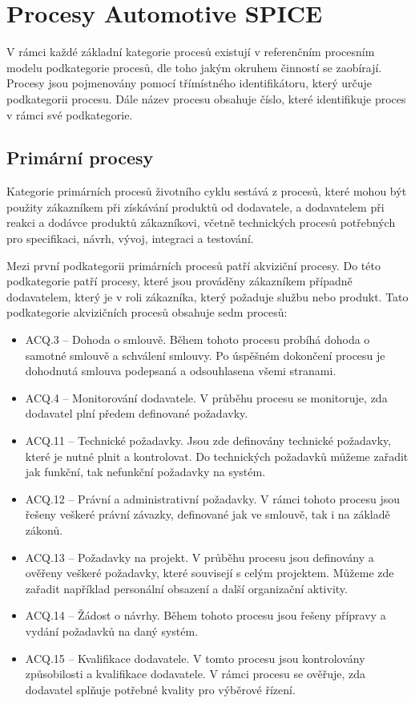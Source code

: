 \documentclass[czech,master]{diploma}
\begin{document}

\section{Procesy Automotive SPICE}
\label{sec:aspice_processes}
V rámci každé základní kategorie procesů existují v referenčním procesním modelu podkategorie procesů, dle toho jakým okruhem činností se zaobírají. Procesy jsou pojmenovány pomocí třímístného identifikátoru, který určuje podkategorii procesu. Dále název procesu obsahuje číslo, které identifikuje proces v rámci své podkategorie.

\subsection{Primární procesy}
Kategorie primárních procesů životního cyklu sestává z procesů, které mohou být použity zákazníkem při získávání produktů od dodavatele, a dodavatelem při reakci a dodávce produktů zákazníkovi, včetně technických procesů potřebných pro specifikaci, návrh, vývoj, integraci a testování.

Mezi první podkategorii primárních procesů patří akviziční procesy. Do této podkategorie patří procesy, které jsou prováděny zákazníkem případně dodavatelem, který je v roli zákazníka, který požaduje  službu nebo produkt. Tato podkategorie akvizičních procesů obsahuje sedm procesů:

\begin{itemize}
\item ACQ.3 -- Dohoda o smlouvě. Během tohoto procesu probíhá dohoda o samotné smlouvě a schválení smlouvy. Po úspěšném dokončení procesu je dohodnutá smlouva podepsaná a odsouhlasena všemi stranami.
\item ACQ.4 -- Monitorování dodavatele. V průběhu procesu se monitoruje, zda dodavatel plní předem definované požadavky.
\item ACQ.11 -- Technické požadavky. Jsou zde definovány technické požadavky, které je nutné plnit a kontrolovat. Do technických požadavků můžeme zařadit jak funkční, tak nefunkční požadavky na systém.
\item ACQ.12 -- Právní a administrativní požadavky. V rámci tohoto procesu jsou řešeny veškeré právní závazky, definované jak ve smlouvě, tak i  na základě zákonů.
\item ACQ.13 -- Požadavky na projekt. V průběhu procesu jsou definovány a ověřeny veškeré požadavky, které souvisejí s celým projektem. Můžeme zde zařadit například personální obsazení a další organizační aktivity.
\item ACQ.14 -- Žádost o návrhy.  Během tohoto procesu jsou řešeny přípravy a vydání požadavků na daný systém.
\item ACQ.15 -- Kvalifikace dodavatele. V tomto procesu jsou kontrolovány způsobilosti a kvalifikace dodavatele. V rámci procesu se ověřuje, zda dodavatel splňuje potřebné kvality pro výběrové řízení.
\end{itemize}
\end{document}
